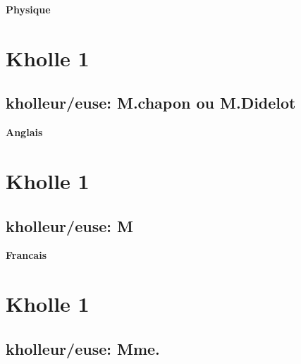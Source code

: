 \documentclass{article}
\begin{document}
\begin{center}
\textbf{\large Physique}
\end{center} \vspace{0.2cm}

\section{Kholle 1}
\subsection{kholleur/euse: M.chapon ou M.Didelot}

\vspace{5mm}


\begin{center}
\textbf{\large Anglais}
\end{center} \vspace{0.2cm}

\section{Kholle 1}
\subsection{kholleur/euse: M}


\begin{center}
\textbf{\large Francais}
\end{center} \vspace{0.2cm}

\section{Kholle 1}
\subsection{kholleur/euse: Mme.}
\end{document}
